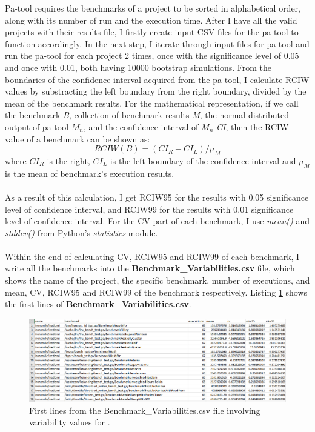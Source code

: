 \documentclass{seal_thesis}
\begin{document}
Pa-tool requires the benchmarks of a project to be sorted in alphabetical order, along with its number of run and the execution time. After I have all the valid projects with their results file, I firstly create input CSV files for the pa-tool to function accordingly. In the next step, I iterate through input files for pa-tool and run the pa-tool for each project 2 times, once with the significance level of 0.05 and once with 0.01, both having 10000 bootstrap simulations. From the boundaries of the confidence interval acquired from the pa-tool, I calculate RCIW values by substracting the left boundary from the right boundary, divided by the mean of the benchmark results. For the mathematical representation, if we call the benchmark \textit{B}, collection of benchmark results \textit{M}, the normal distributed output of pa-tool $M_{n}$, and the confidence interval of $M_{n}$ \textit{CI}, then the RCIW value of a benchmark can be shown as:
\[ RCIW(B) = ({CI_{R}} - {CI_{L}}) / \mu _{M} \]
where $CI_{R}$ is the right, $CI_{L}$ is the left boundary of the confidence interval and $\mu _{M}$ is the mean of benchmark's execution results.\\
\\
\noindent As a result of this calculation, I get RCIW95 for the results with 0.05 significance level of confidence interval, and RCIW99 for the results with 0.01 significance level of confidence interval. For the CV part of each benchmark, I use \textit{mean()} and \textit{stddev()} from Python's \textit{statistics} module\cite{pythonsta}.\\
\\
Within the end of calculating CV, RCIW95 and RCIW99 of each benchmark, I write all the benchmarks into the \textbf{Benchmark\_Variabilities.csv} file, which shows the name of the project, the specific benchmark, number of executions, and mean, CV, RCIW95 and RCIW99 of the benchmark respectively. Listing \ref{fig:finalcsv} shows the first lines of \textbf{Benchmark\_Variabilities.csv}.

\begin{figure}[H]
	\centering
	\includegraphics[width=\linewidth]{finalcsvexample}
	\caption{First lines from the Benchmark\_Variabilities.csv file involving variability values for \cite{ironsmile/nedomi}.}
	\label{fig:finalcsv}
\end{figure}
\end{document}
